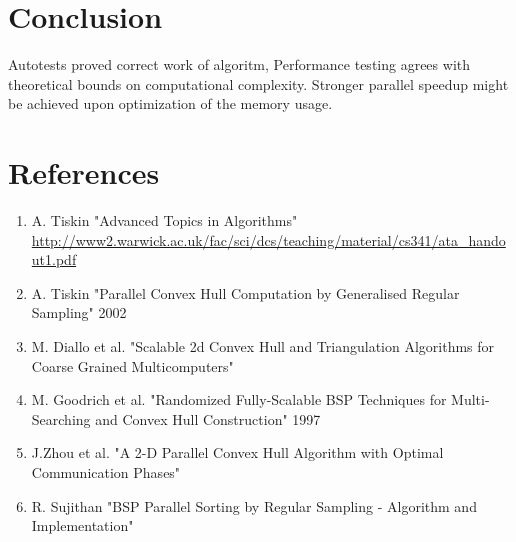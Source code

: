 \documentclass[a4paper]{article}
\begin{document}
\section {Conclusion}
    Autotests proved correct work of algoritm,
    Performance testing agrees with theoretical bounds on computational complexity.
    Stronger parallel speedup might be achieved upon optimization of the memory usage.



\section {References}
    \begin {enumerate}
        \item A. Tiskin "Advanced Topics in Algorithms" \url{http://www2.warwick.ac.uk/fac/sci/dcs/teaching/material/cs341/ata_handout1.pdf}
        \item A. Tiskin "Parallel Convex Hull Computation by Generalised Regular Sampling" 2002
        \item M. Diallo et al. "Scalable 2d Convex Hull and Triangulation Algorithms for Coarse Grained Multicomputers"
        \item M. Goodrich et al. "Randomized Fully-Scalable BSP Techniques for Multi-Searching and Convex Hull Construction" 1997
        \item J.Zhou et al. "A 2-D Parallel Convex Hull Algorithm with Optimal Communication Phases"
        \item R. Sujithan "BSP Parallel Sorting by Regular Sampling - Algorithm and Implementation"
    \end {enumerate}
\end{document}

